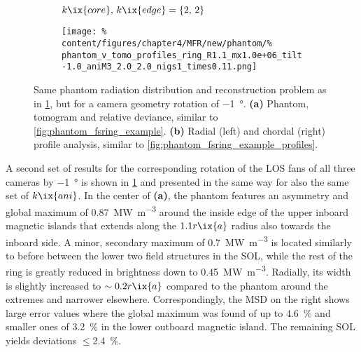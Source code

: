 %
            \begin{figure}[t]%
                \centering%
                \begin{subfigure}{\textwidth}%
                    \centering%
                    \caption{$k\ix{core},\,k\ix{edge}=\left\{2,\,2\right\}$}%
                \end{subfigure}%
                \newline%
                \begin{subfigure}{\textwidth}%
                    \centering%
                    \texttt{[image: \%
                        content/figures/chapter4/MFR/new/phantom/\%
                        phantom\_v\_tomo\_profiles\_ring\_R1.1\_mx1.0e+06\_tilt-1.0\_aniM3\_2.0\_2.0\_nigs1\_times0.11.png]}%
                    \caption{}%
                \end{subfigure}%
                \caption{Same phantom radiation distribution and reconstruction problem as in \cref{fig:phantom_fsring_tilt_-1deg}, but for a camera geometry rotation of \SI{-1}{\degree}. \textbf{(a)} Phantom, tomogram and relative deviance, similar to \cref{fig:phantom_fsring_example}. \textbf{(b)} Radial (left) and chordal (right) profile analysis, similar to \cref{fig:phantom_fsring_example_profiles}.}\label{fig:phantom_fsring_tilt_-1deg}%
            \end{figure}%
%
            A second set of results for the corresponding rotation of the LOS fans of all three cameras by $-$\SI{1}{\degree} is shown in \cref{fig:phantom_fsring_tilt_-1deg} and presented in the same way for also the same set of $k\ix{ani}$. In the center of \textbf{(a)}, the phantom features an asymmetry and global maximum of \SI{0.87}{\mega\watt\per\cubic\meter} around the inside edge of the upper inboard magnetic islands that extends along the $1.1r\ix{a}$ radius also towards the inboard side. A minor, secondary maximum of \SI{0.7}{\mega\watt\per\cubic\meter} is located similarly to before between the lower two field structures in the SOL, while the rest of the ring is greatly reduced in brightness down to \SI{0.45}{\mega\watt\per\cubic\meter}. Radially, its width is slightly increased to $\sim0.2r\ix{a}$ compared to the phantom around the extremes and narrower elsewhere. Correspondingly, the MSD on the right shows large error values where the global maximum was found of up to \SI{4.6}{\percent} and smaller ones of \SI{3.2}{\percent} in the lower outboard magnetic island. The remaining SOL yields deviations $\le$\SI{2.4}{\percent}.\\%
